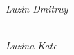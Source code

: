 \begin{figure}[H]
\begin{minipage}[h]{0.47\linewidth}
		\emph{Luzin Dmitruy}
	\end{minipage}
	\hfill
	\begin{minipage}[h]{0.47\linewidth}
		\\
		\emph{Luzina Kate}
	\end{minipage}
\end{figure}

\newpage
